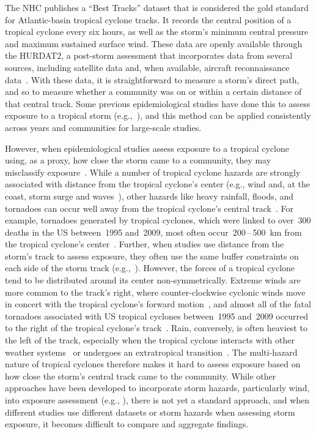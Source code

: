 The \ac{NHC} publishes a ``Best Tracks'' dataset that is considered the gold
standard for Atlantic-basin tropical cyclone tracks.  It records the central
position of a tropical cyclone every six hours, as well as the storm's minimum
central pressure and maximum sustained surface wind.  These data are openly
available through the \ac{HURDAT2}, a post-storm assessment that incorporates
data from several sources, including satellite data and, when available,
aircraft reconnaissance data~\parencite{landsea2013, jarvinen1988}.  With these
data, it is straightforward to measure a storm's direct path, and so to measure
whether a community was on or within a certain distance of that central track.
Some previous epidemiological studies have done this to assess exposure to a
tropical storm (e.g.,~\cite{currie2013, kinney2008, caillouet2008increase}), 
and this method can be applied consistently across years and communities 
for large-scale studies.

However, when epidemiological studies assess exposure to a tropical cyclone
using, as a proxy, how close the storm came to a community, they may
misclassify exposure~\parencite{grabich2015measuring}. While a number of
tropical cyclone hazards are strongly associated with distance from the
tropical cyclone's center (e.g., wind and, at the coast, storm surge and
waves~\parencite{rappaport2000, kruk2010}), other hazards like heavy rainfall,
floods, and tornadoes can occur well away from the tropical cyclone's central
track~\parencite{rappaport2000, atallah2007, moore2012}.  For example,
tornadoes generated by tropical cyclones, which were linked to over~300 deaths
in the \ac{US} between~1995 and~2009, most often
occur~200\,--\,500~\si{\kilo\metre} from the tropical cyclone's
center~\parencite{moore2012}.  Further, when studies use distance from the
storm's track to assess exposure, they often use the same buffer constraints on
each side of the storm track (e.g.,~\cite{kinney2008, currie2013}).  However,
the forces of a tropical cyclone tend to be distributed around its center
non-symmetrically.  Extreme winds are more common to the track's right, where
counter-clockwise cyclonic winds move in concert with the tropical cyclone's
forward motion~\parencite{halverson2015}, and almost all of the fatal tornadoes
associated with \ac{US} tropical cyclones between~1995 and~2009 occurred to the
right of the tropical cyclone's track~\parencite{moore2012}. Rain, conversely,
is often heaviest to the left of the track, especially when the tropical
cyclone interacts with other weather systems~\parencite{atallah2003,
atallah2007, zhu2013variations} or undergoes an extratropical
transition~\parencite{elsberry2002}.  The multi-hazard nature of tropical
cyclones therefore makes it hard to assess exposure based on how close the
storm's central track came to the community.  While other approaches have been
developed to incorporate storm hazards, particularly wind, into exposure
assessment (e.g., \cite{grabich2015measuring, zandbergen2009, czajkowski2011}),
there is not yet a standard approach, and when different studies use
different datasets or storm hazards when assessing storm exposure, it becomes
difficult to compare and aggregate findings. 

